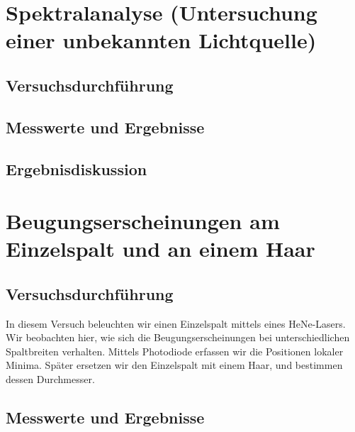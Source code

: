 \documentclass{scrartcl}
\begin{document}
\section{Spektralanalyse (Untersuchung einer unbekannten Lichtquelle)}
\subsection{Versuchsdurchführung}
\subsection{Messwerte und Ergebnisse}
\subsection{Ergebnisdiskussion}

\section{Beugungserscheinungen am Einzelspalt und an einem Haar}
\subsection{Versuchsdurchführung}
In diesem Versuch beleuchten wir einen Einzelspalt mittels eines HeNe-Lasers. Wir beobachten hier, wie sich die Beugungserscheinungen bei unterschiedlichen Spaltbreiten verhalten. Mittels Photodiode erfassen wir die Positionen lokaler Minima. Später ersetzen wir den Einzelspalt mit einem Haar, und bestimmen dessen Durchmesser.
\subsection{Messwerte und Ergebnisse}
\end{document}
